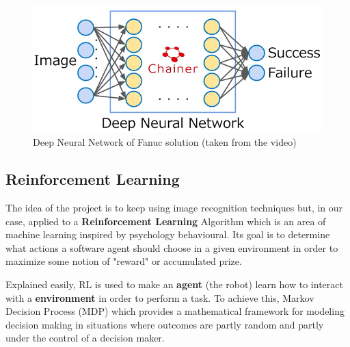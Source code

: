 	\begin{figure}
		\centering
		\includegraphics[width=1\linewidth]{Images/FANUC_DNN.png}
		\caption[Fanuc DNN]{Deep Neural Network of Fanuc solution (taken from the video)}
		\label{fig:fanucdnn}
	\end{figure}
	
	\subsection{Reinforcement Learning}
	
		The idea of the project is to keep using image recognition techniques but, in our case, applied to a \textbf{Reinforcement Learning} Algorithm which is an area of machine learning inspired by psychology behavioural. Its goal is to determine what actions a software agent should choose in a given environment in order to maximize some notion of "reward" or accumulated prize. 
		
		Explained easily, RL is used to make an \textbf{agent} (the robot) learn how to interact with a \textbf{environment} in order to perform a task. To achieve this, Markov Decision Process (MDP) which provides a mathematical framework for modeling decision making in situations where outcomes are partly random and partly under the control of a decision maker.
		

